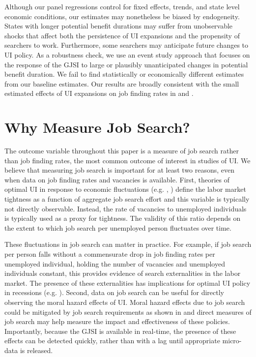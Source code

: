 \documentclass[12pt]{article}
\begin{document}
\begin{spacing}{2}
Although our panel regressions control for fixed effects, trends, and state level economic conditions, our estimates may nonetheless be biased by endogeneity. States with longer potential benefit durations may suffer from unobservable shocks that affect both the persistence of UI expansions and the propensity of searchers to work. Furthermore, some searchers may anticipate future changes to UI policy. As a robustness check, we use an event study approach that focuses on the response of the GJSI to large or plausibly unanticipated changes in potential benefit duration. We fail to find statistically or economically different estimates from our baseline estimates. Our results are broadly consistent with the small estimated effects of UI expansions on job finding rates in \citet{Rothstein2011} and \citet{Farber2013}.



\section{Why Measure Job Search?}
The outcome variable throughout this paper is a measure of job search rather than job finding rates, the most common outcome of interest in studies of UI. We believe that measuring job search is important for at least two reasons, even when data on job finding rates and vacancies is available. First, theories of optimal UI in response to economic fluctuations (e.g. \citet{Landais2015}, \citet{Schmieder2012}) define the labor market tightness as a function of aggregate job search effort and this variable is typically not directly observable. Instead, the rate of vacancies to unemployed individuals is typically used as a proxy for tightness. The validity of this ratio depends on the extent to which job search per unemployed person fluctuates over time.

These fluctuations in job search can matter in practice. For example, if job search per person falls without a commensurate drop in job finding rates per unemployed individual, holding the number of vacancies and unemployed individuals constant, this provides evidence of search externalities in the labor market. The presence of these externalities has implications for optimal UI policy in recessions (e.g. \citet{Landais2015}). Second, data on job search can be useful for directly observing the moral hazard effects of UI. Moral hazard effects due to job search could be mitigated by job search requirements as shown in \citet{Lachowska2015} and direct measures of job search may help measure the impact and effectiveness of these policies. Importantly, because the GJSI is available in real-time, the presence of these effects can be detected quickly, rather than with a lag until appropriate micro-data is released.


\end{spacing}
\end{document}
